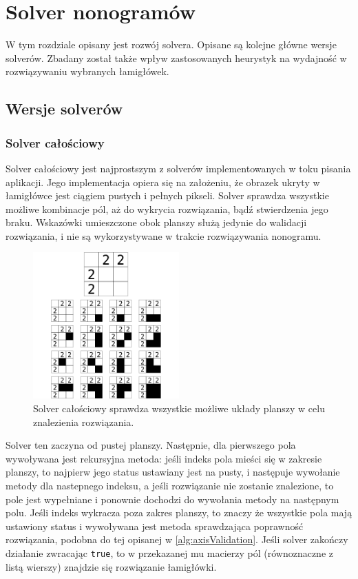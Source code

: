 \chapter{Solver nonogramów}
\thispagestyle{chapterBeginStyle}

    W tym rozdziale opisany jest rozwój solvera. Opisane są kolejne główne wersje solverów. Zbadany
został także wpływ zastosowanych heurystyk na wydajność w rozwiązywaniu wybranych łamigłówek.



\section{Wersje solverów}


\subsection{Solver całościowy}
    Solver całościowy jest najprostszym z solverów implementowanych w toku pisania aplikacji. Jego
implementacja opiera się na założeniu, że obrazek ukryty w łamigłówce jest ciągiem pustych i pełnych
pikseli. Solver sprawdza wszystkie możliwe kombinacje pól, aż do wykrycia rozwiązania, bądź stwierdzenia
jego braku. Wskazówki umieszczone obok planszy służą jedynie do walidacji rozwiązania, i nie są
wykorzystywane w trakcie rozwiązywania nonogramu.

\begin{figure}[!htb]
    \centering
    \includegraphics[width=0.5\textwidth]{images/all_solver_example.png}
    \caption{Solver całościowy sprawdza wszystkie możliwe układy planszy w celu znalezienia rozwiązania.}
\end{figure}

    Solver ten zaczyna od pustej planszy. Następnie, dla pierwszego pola wywoływana jest rekursyjna
metoda: jeśli indeks pola mieści się w zakresie planszy, to najpierw jego status ustawiany jest na
pusty, i następuje wywołanie metody dla nastepnego indeksu, a jeśli rozwiązanie nie zostanie znalezione,
to pole jest wypełniane i ponownie dochodzi do wywołania metody na następnym polu. Jeśli indeks
wykracza poza zakres planszy, to znaczy że wszystkie pola mają ustawiony status i wywoływana jest
metoda sprawdzająca poprawność rozwiązania, podobna do tej opisanej w \ref{alg:axisValidation}.
Jeśli solver zakończy działanie zwracając \texttt{true}, to w przekazanej mu macierzy pól 
(równoznaczne z listą wierszy) znajdzie się rozwiązanie łamigłówki.

